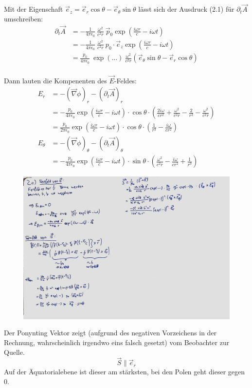 \documentclass[11pt a4paper]{article}
\newcommand{\delt}{\partial_t}
\newcommand{\epsz}{\epsilon_0}
\newcommand{\grad}{\vec \nabla}
\begin{document}
Mit der Eigenschaft $\vec e_z = \vec e_r \cos\theta - \vec e_\theta \sin\theta$ lässt sich der 
Ausdruck (2.1) für $\delt \vec A$ umschreiben:
\begin{align*}
	\delt \vec A
	&= - \frac{1}{4\pi\epsz} \ \frac{\omega^2}{c^2 r} \ 
	\vec p_0 \exp\left(\frac{i\omega r}{c} - i\omega t \right) \\
	&= - \frac{1}{4\pi\epsz} \ \frac{\omega^2}{c^2 r} \ 
	p_0 \cdot \vec e_z \exp\left(\frac{i\omega r}{c} - i\omega t \right) \\
	&= \frac{p_0}{4\pi\epsz} \
	\exp(\hdots)  \
	\frac{\omega^2}{c^2 r} 
	\left(\vec e_\theta \sin\theta - \vec e_r \cos\theta \right)
	\\
\end{align*}

\newpage
Dann lauten die Kompenenten des $\vec E$-Feldes:
\begin{align*}
	E_r 
	&= -\left(\grad \phi \right)_r -\left(\delt \vec A \right)_r  \\
	&= - \frac{p_0}{4\pi\epsz} \exp\left(\frac{i\omega r}{c} - i\omega t \right) \cdot \cos\theta
	\cdot \left(\frac{2i\omega}{cr^2} + \frac{\omega^2}{c^2r} -\frac{2}{r^3} - \frac{\omega^2}{c^2r} \right) \\
	&= \frac{p_0}{2\pi\epsz} \exp\left(\frac{i\omega r}{c} - i\omega t \right) \cdot \cos\theta
	\cdot \left(\frac{1}{r^3} - \frac{i\omega}{cr^2} \right) \\
	E_\theta
	&= -\left(\grad \phi \right)_\theta -\left(\delt \vec A \right)_\theta  \\
	&= - \frac{p_0}{4\pi\epsz} \exp\left(\frac{i\omega r}{c} - i\omega t \right) \cdot \sin\theta
	\cdot \left(\frac{\omega^2}{c^2r} - \frac{i\omega}{cr^2} + \frac{1}{r^3} \right)
\end{align*}
\begin{figure}[H]
	\centering
	\includegraphics[width=17cm]{2c.jpg}
\end{figure}
Der Ponynting Vektor zeigt (aufgrund des negativen Vorzeichens in der Rechnung, wahrscheinlich irgendwo eins 
falsch gesetzt) vom Beobachter zur Quelle.
\[ \vec S \parallel \vec e_r \]
Auf der Äquatorialebene ist dieser am stärksten, bei den Polen geht dieser gegen 0.
\end{document}
